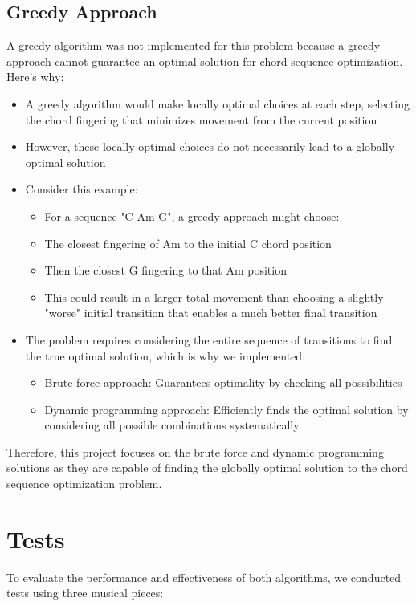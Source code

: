 \documentclass[conference]{IEEEtran}
\begin{document}
\subsection{Greedy Approach}
A greedy algorithm was not implemented for this problem because a greedy approach cannot guarantee an optimal solution for chord sequence optimization. Here's why:

\begin{itemize}
    \item A greedy algorithm would make locally optimal choices at each step, selecting the chord fingering that minimizes movement from the current position
    \item However, these locally optimal choices do not necessarily lead to a globally optimal solution
    \item Consider this example:
    \begin{itemize}
        \item For a sequence "C-Am-G", a greedy approach might choose:
        \item The closest fingering of Am to the initial C chord position
        \item Then the closest G fingering to that Am position
        \item This could result in a larger total movement than choosing a slightly "worse" initial transition that enables a much better final transition
    \end{itemize}
    \item The problem requires considering the entire sequence of transitions to find the true optimal solution, which is why we implemented:
    \begin{itemize}
        \item Brute force approach: Guarantees optimality by checking all possibilities
        \item Dynamic programming approach: Efficiently finds the optimal solution by considering all possible combinations systematically
    \end{itemize}
\end{itemize}

Therefore, this project focuses on the brute force and dynamic programming solutions as they are capable of finding the globally optimal solution to the chord sequence optimization problem.

\section{Tests}
To evaluate the performance and effectiveness of both algorithms, we conducted tests using three musical pieces:
\end{document}
